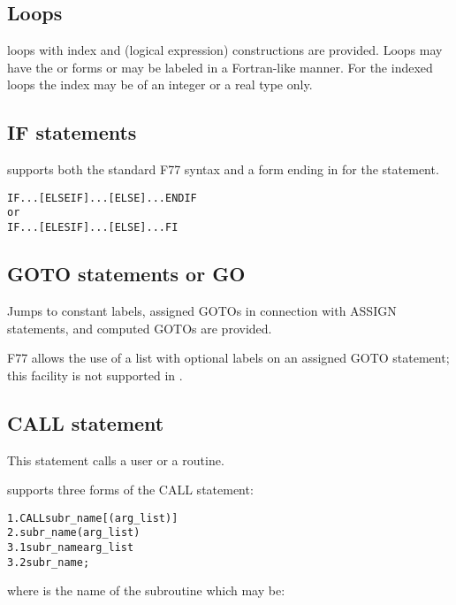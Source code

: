 \subsection*{Loops}
 
 loops with index and  (logical expression) constructions
are  provided.
Loops may have the  or  forms or may be labeled
in a Fortran-like manner. For the indexed loops the index may be of
an integer or a real type only.
 
\subsection{IF statements}

\COMIS{} supports both the standard F77 syntax
and a form ending in  for the  statement.
\begin{alltt}
     IF...[ELSEIF]...[ELSE]...ENDIF
\textrm{or}
     IF...[ELESIF]...[ELSE]...FI
\end{alltt} 
 
\subsection*{GOTO statements or GO}
 
Jumps to constant labels, assigned GOTOs in connection with
ASSIGN statements, and computed GOTOs are provided.

F77 allows the use of a list with optional labels on an assigned GOTO statement;
this facility is not supported in \COMIS.
 
\subsection*{CALL statement}
 
This statement calls a user or a \COMIS{} routine.

\COMIS{} supports three forms of the CALL statement:

\begin{alltt}
  1.   CALL subr_name [( arg_list)]
  2.   subr_name ( arg_list)
  3.1  subr_name  arg_list
  3.2  subr_name;
\end{alltt}

where  is the name of the subroutine which may be:

